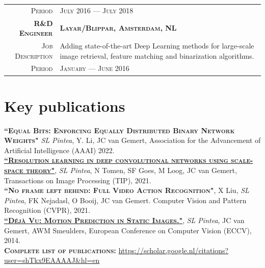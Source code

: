 \documentclass[a4paper, oneside, final]{scrartcl}
\newcommand{\gray}{\rowcolor[gray]{.90}}
\begin{document}
\begin{center}
\begin{tabular}{r@{\hskip 0.3in}p{12.3cm}}
			\textsc{Period}                     & \textsc{July 2016 --- July 2018} 
            \vspace{5px}\\
			\gray \textsc{\textbf{R\&D Engineer}}   & \textsc{\textbf{Layar\slash Blippar, Amsterdam, NL}}\\
			\textsc{Job Description}                &  Adding state-of-the-art Deep Learning methods for large-scale image retrieval, 
				feature matching and binarization algorithms.\\
			\textsc{Period}                         & \textsc{January --- June 2016} 
		\end{tabular}

		\section{Key publications}
        \begin{flushleft}
            \textsc{\textbf{``Equal Bits: Enforcing Equally Distributed Binary Network Weights"}} \emph{SL Pintea}, Y. Li, JC van Gemert, Association for the Advancement of Artificial Intelligence (AAAI) 2022.\\[3px]

            \textsc{\textbf{\href{https://github.com/SilviaLauraPintea/N-JetNet}{``Resolution learning in deep convolutional networks using scale-space theory"}}}, \emph{SL Pintea}, N Tomen, SF Goes, M Loog, JC van Gemert, Transactions on Image Processing (TIP), 2021.\\[3px]
			\textsc{\textbf{``No frame left behind: Full Video Action Recognition"}}, X Liu, \emph{SL Pintea}, FK Nejadasl, O Booij, JC van Gemert. 
            Computer Vision and Pattern Recognition (CVPR), 2021.\\[3px]
            \textsc{\textbf{\href{http://github.com/SilviaLauraPintea/DejaVu}{``D\'{e}j\`{a} Vu: Motion Prediction in Static Images."}}}, \emph{SL Pintea}, JC van Gemert, AWM Smeulders, 
            European Conference on Computer Vision (ECCV), 2014.\\[10px]
            \textsc{\textbf{Complete list of publications:}} \href{https://scholar.google.nl/citations?user=shTkx9EAAAAJ&hl=en}{https://scholar.google.nl/citations?user=shTkx9EAAAAJ\&hl=en}\\
        \end{flushleft}

\end{center}
\end{document}
